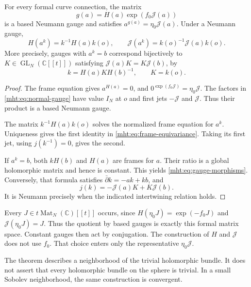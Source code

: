 \begin{theorem}\label{mht:thm:neumann-normal-form}
For every formal curve connection, the matrix
\begin{equation}\label{mht:eq:normal-gauge}
 g(a)=H(a)\exp(f_0\mathcal J(a))
\end{equation}
is a based Neumann gauge and satisfies
$a^{g(a)}=\eta_0\mathcal J(a)$. Under a Neumann gauge,
\begin{equation}\label{mht:eq:frame-equivariance}
 H(a^k)=k^{-1}H(a)k(o),\qquad
 \mathcal J(a^k)=k(o)^{-1}\mathcal J(a)k(o).
\end{equation}
More precisely, gauges with $a^k=b$ correspond bijectively to
$K\in\operatorname{GL}_N(\mathbb C[[t]])$ satisfying
$\mathcal J(a)K=K\mathcal J(b)$, by
\begin{equation}\label{mht:eq:gauge-morphisms}
 k=H(a)KH(b)^{-1},\qquad K=k(o).
\end{equation}
\end{theorem}

\begin{proof}
The frame equation gives $a^{H(a)}=0$, and
$0^{\exp(f_0\mathcal J)}=\eta_0\mathcal J$.
The factors in \eqref{mht:eq:normal-gauge} have value $I_N$ at $o$ and
first jets $-\mathcal J$ and $\mathcal J$. Thus their product is a based
Neumann gauge.

The matrix $k^{-1}H(a)k(o)$ solves the normalized frame equation for
$a^k$. Uniqueness gives the first identity in
\eqref{mht:eq:frame-equivariance}. Taking its first jet, using
$j(k^{-1})=0$, gives the second.

If $a^k=b$, both $kH(b)$ and $H(a)$ are frames for $a$. Their ratio is
a global holomorphic matrix and hence is constant. This yields
\eqref{mht:eq:gauge-morphisms}. Conversely, that formula satisfies
$\bar\partial k=-ak+kb$, and
\[
 j(k)=-\mathcal J(a)K+K\mathcal J(b).
\]
It is Neumann precisely when the indicated intertwining relation holds.
\end{proof}

Every $J\in t\operatorname{Mat}_N(\mathbb C)[[t]]$ occurs, since
$H(\eta_0J)=\exp(-f_0J)$ and $\mathcal J(\eta_0J)=J$.
Thus the quotient by based gauges is exactly this formal matrix space.
Constant gauges then act by conjugation. The construction of $H$ and
$\mathcal J$ does not use $f_0$. That choice enters only the representative
$\eta_0\mathcal J$.

The theorem describes a neighborhood of the trivial holomorphic bundle.
It does not assert that every holomorphic bundle on the sphere is
trivial. In a small Sobolev neighborhood, the same construction is
convergent.


